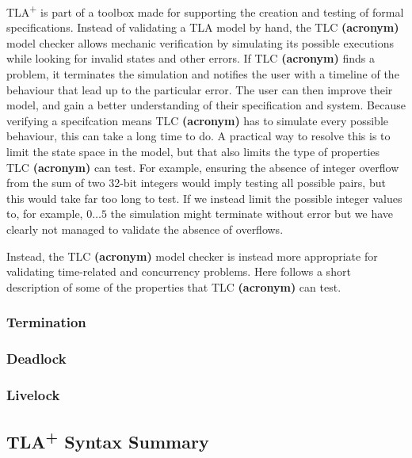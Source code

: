 \documentclass[english, biblatex, digitaloutput]{kththesis}
\begin{document}
TLA\textsuperscript+ is part of a toolbox made for supporting the creation and testing of formal specifications. Instead of validating a TLA model by hand, the TLC \textbf{(acronym)} model checker allows mechanic verification by simulating its possible executions while looking for invalid states and other errors. If TLC \textbf{(acronym)} finds a problem, it terminates the simulation and notifies the user with a timeline of the behaviour that lead up to the particular error. The user can then improve their model, and gain a better understanding of their specification and system. Because verifying a specifcation means TLC \textbf{(acronym)} has to simulate every possible behaviour, this can take a long time to do. A practical way to resolve this is to limit the state space in the model, but that also limits the type of properties TLC \textbf{(acronym)} can test. For example, ensuring the absence of integer overflow from the sum of two 32-bit integers would imply testing all possible pairs, but this would take far too long to test. If we instead limit the possible integer values to, for example, $0 \dotsc 5$ the simulation might terminate without error but we have clearly not managed to validate the absence of overflows. 

Instead, the TLC \textbf{(acronym)} model checker is instead more appropriate for validating time-related and concurrency problems. Here follows a short description of some of the properties that TLC \textbf{(acronym)} can test. 

\subsubsection{Termination}

\subsubsection{Deadlock}

\subsubsection{Livelock}

\subsection{TLA\textsuperscript+ Syntax Summary}



\end{document}

